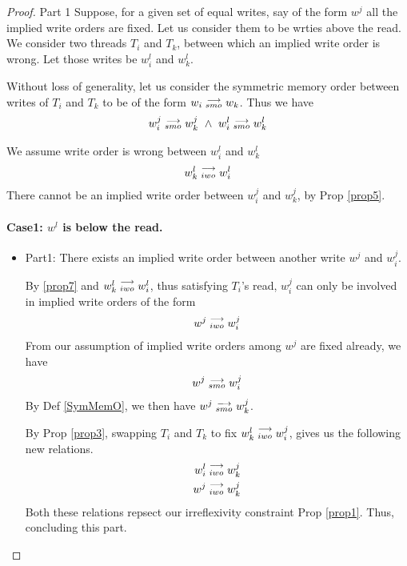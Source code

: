         \begin{proof}{Part 1}
            Suppose, for a given set of equal writes, say of the form $w^j$ all the implied write orders are fixed. Let us consider them to be wrties above the read. We consider two threads $T_i$ and $T_k$, between which an implied write order is wrong. Let those writes be $w_i^l$ and $w_k^l$. 

            Without loss of generality, let us consider the symmetric memory order between writes of $T_i$ and $T_k$ to be of the form $w_i\stackrel{\longrightarrow}{_{smo}}w_k$. Thus we have 
            \begin{align*}
                \reln{w_i^j}{smo}{w_k^j} \ \wedge \ \reln{w_i^l}{smo}{w_k^l}
            \end{align*}

            We assume write order is wrong between $w_i^l$ and $w_k^l$
            \begin{align*}
                w_k^l\stackrel{\longrightarrow}{_{iwo}}w_i^l
            \end{align*} 
            There cannot be an implied write order between $w_i^j$ and $w_k^j$, by Prop \ref{prop5}. 

            \paragraph{Case1: $w^l$ is below the read.}
                
                \begin{itemize}
                    \item Part1: There exists an implied write order between another write $w^j$ and $w_i^j$. 

                        By \ref{prop7} and $w_k^l\stackrel{\longrightarrow}{_{iwo}}w_i^l$, thus satisfying $T_i$'s read, $w_i^j$ can only be involved in implied    write orders of the form 
                        \begin{align*}
                            w^j\stackrel{\longrightarrow}{_{iwo}}w_i^j
                        \end{align*}
                        From our assumption of implied write orders among $w^j$ are fixed already, we have
                        \begin{align*}
                            w^j\stackrel{\longrightarrow}{_{smo}}w_i^j 
                        \end{align*} 
                        By Def \ref{SymMemO}, we then have $w^j\stackrel{\longrightarrow}{_{smo}}w_k^j$.

                        By Prop \ref{prop3}, swapping $T_i$ and $T_k$ to fix $w_k^l\stackrel{\longrightarrow}{_{iwo}}w_i^j$, gives us the following new relations.
                        \begin{align*}
                            w_i^l\stackrel{\longrightarrow}{_{iwo}}w_k^j \\
                            w^j\stackrel{\longrightarrow}{_{iwo}}w_k^j
                        \end{align*}
                        Both these relations repsect our irreflexivity constraint Prop \ref{prop1}. Thus, concluding this part. 


\end{itemize}
\end{proof}
